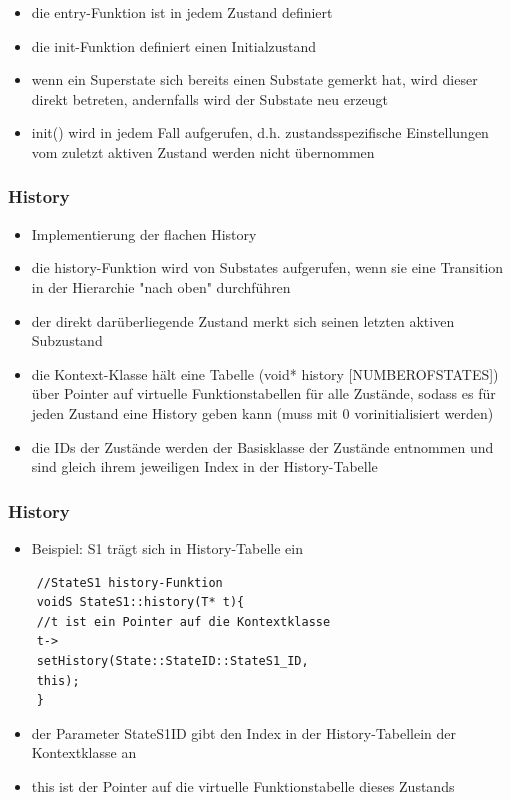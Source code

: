 \documentclass{beamer}
\begin{document}
\begin{frame}[fragile]
	\begin{itemize}
		\item die entry-Funktion ist in jedem Zustand definiert
		\item die init-Funktion definiert einen Initialzustand
		\item wenn ein Superstate sich bereits einen Substate gemerkt hat, wird dieser direkt betreten, andernfalls wird der Substate neu erzeugt
		\item init() wird in jedem Fall aufgerufen, d.h. zustandsspezifische Einstellungen vom zuletzt aktiven Zustand werden nicht \"ubernommen
	\end{itemize}
\end{frame}

\begin{frame}
	\frametitle{History}
	\begin{itemize}
		\item Implementierung der flachen History
		\item die history-Funktion wird von Substates aufgerufen, wenn sie eine Transition in der Hierarchie "nach oben" durchf\"uhren
		\item der direkt dar\"uberliegende Zustand merkt sich seinen letzten aktiven Subzustand
		\item die Kontext-Klasse h\"alt eine Tabelle (void* history [NUMBEROFSTATES]) \"uber Pointer auf virtuelle Funktionstabellen f\"ur alle Zust\"ande, sodass es f\"ur jeden Zustand eine History geben kann (muss mit 0 vorinitialisiert werden)
		\item die IDs der Zust\"ande werden der Basisklasse der Zust\"ande entnommen und sind gleich ihrem jeweiligen Index in der History-Tabelle
	\end{itemize}
\end{frame}

\begin{frame}[fragile]
	\frametitle{History}
	\begin{itemize}
		\item Beispiel: S1 tr\"agt sich in History-Tabelle ein
	\end{itemize}
	\begin{lstlisting}
	//StateS1 history-Funktion
	voidS StateS1::history(T* t){
	//t ist ein Pointer auf die Kontextklasse
	t->
	setHistory(State::StateID::StateS1_ID,
	this);
	}
	\end{lstlisting}
	\begin{itemize}
		\item der Parameter StateS1ID gibt den Index in der History-Tabellein der Kontextklasse an
		\item this ist der Pointer auf die virtuelle Funktionstabelle dieses Zustands 
	\end{itemize}
\end{frame}
\end{document}
